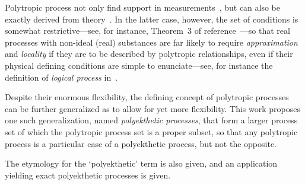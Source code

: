     Polytropic process not only find support  in  measurements~\cite{2013-CengelYA+BolesMA-AMGH,
    2002-MoranMJ+ShapiroHN-LTC,  1985-WylenG-Wiley},  but  can  also  be  exactly  derived  from
    theory~\cite{2012-ChristiansJ-IntJMechEngEduc, 2020-NaaktgeborenC-engrXiv}.  In  the  latter
    case, however, the set of conditions is somewhat restrictive---see, for instance,  Theorem~3
    of  reference~\cite{2020-NaaktgeborenC-engrXiv}---so  that  real  processes  with  non-ideal
    (real) substances are far likely to require \emph{approximation} and \emph{locality} if they
    are to be described by polytropic relationships, even if their physical defining  conditions
    are simple to  enunciate---see,  for  instance  the  definition  of  \emph{logical  process}
    in~\cite{2020-NaaktgeborenC-engrXiv}.

    Despite their enormous flexibility, the defining concept  of  polytropic  processes  can  be
    further generalized as to allow for yet  more  flexibility.  This  work  proposes  one  such
    generalization, named \emph{polyekthetic processes}, that form a larger process set of which
    the polytropic process set is  a  proper  subset,  so  that  any  polytropic  process  is  a
    particular case of a polyekthetic process, but not the opposite.

    The etymology for the `polyekthetic' term is also given, and an application  yielding  exact
    polyekthetic processes is given.


